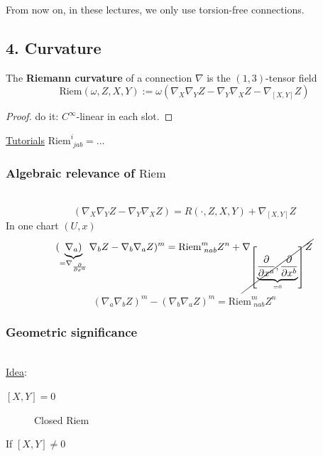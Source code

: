 	From now on, in these lectures, we only use torsion-free connections. 
	
	\subsection*{4. Curvature}
	
	\begin{definition}
		The \textbf{Riemann curvature} of a connection $\nabla$ is the $(1,3)$-tensor field
		\begin{equation}
		\text{Riem}(\omega,Z,X,Y) := \omega( \nabla_X \nabla_Y Z - \nabla_Y \nabla_X Z - \nabla_{[X,Y]} Z)
		\end{equation}
	\end{definition}
	\begin{proof}
		do it: $C^{\infty}$-linear in each slot.  
	\end{proof}
	
	\underline{Tutorials} $\text{Riem}^i_{ \,\, jab} = \dots $
	
\subsubsection*{Algebraic relevance of $\text{Riem}$} \quad \, \\

\[
(\nabla_X \nabla_Y Z - \nabla_Y \nabla_X Z) = R(\cdot, Z,X,Y) + \nabla_{[X,Y]} Z
\]
In one chart $(U, x)$
\[
(\underbrace{\nabla_a)}_{ = \nabla_{\frac{\partial}{\partial x^a} } } \nabla_b Z - \nabla_b \nabla_a Z)^m = \text{Riem}^m_{\,\,nab} Z^n  + \cancel{ \nabla_{\left[ \underbrace{ \frac{\partial }{ \partial x^a} , \frac{\partial}{\partial x^b} }_{ = 0} \right] } Z }
\]
\[
\boxed{  (\nabla_a \nabla_b Z)^m - (\nabla_b \nabla_a Z)^m = \text{Riem}^m_{\,\, nab} Z^n }
\]

\subsubsection*{Geometric significance} \quad \, \\

\underline{Idea}: 

$[X,Y] = 0$

\begin{figure}[ht!]
	\centering

	\caption{Closed Riem}
	\label{dgdt:Fig:ClosedRiem}
\end{figure}

If $[X,Y] \neq 0$

